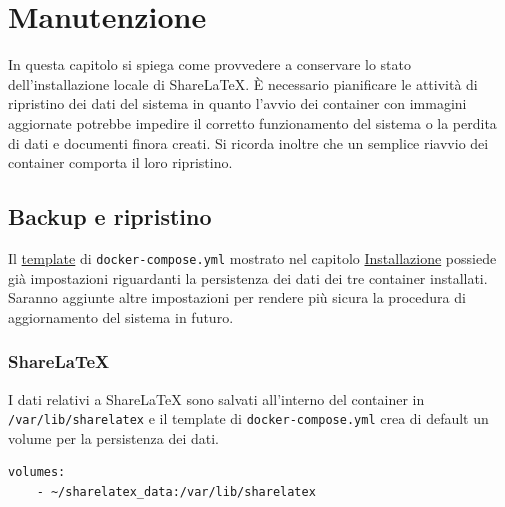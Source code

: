 \chapter{Manutenzione}
\label{Manutenzione}
\thispagestyle{empty}

In questa capitolo si spiega come provvedere a conservare lo stato dell'installazione locale di ShareLaTeX. È necessario pianificare le attività di ripristino dei dati del sistema in quanto l'avvio dei container con immagini aggiornate potrebbe impedire il corretto funzionamento del sistema o la perdita di dati e documenti finora creati. Si ricorda inoltre che un semplice riavvio dei container comporta il loro ripristino.

\section{Backup e ripristino}
Il \hyperref[code:docker-compose.yml]{template} di \verb|docker-compose.yml| mostrato nel capitolo \hyperref[Installazione]{Installazione} possiede già impostazioni riguardanti la persistenza dei dati dei tre container installati. Saranno aggiunte altre impostazioni per rendere più sicura la procedura di aggiornamento del sistema in futuro.

\subsection{ShareLaTeX}
I dati relativi a ShareLaTeX sono salvati all'interno del container in \verb|/var/lib/sharelatex| e il template di \verb|docker-compose.yml| crea di default un volume per la persistenza dei dati.
\begin{lstlisting}
volumes:
    - ~/sharelatex_data:/var/lib/sharelatex
\end{lstlisting}

